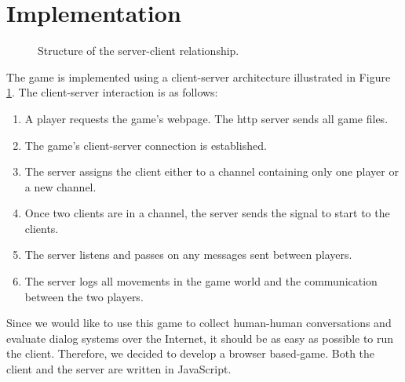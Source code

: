 \section{Implementation}



\begin{figure}
\caption{Structure of the server-client
  relationship.}
\label{fig:server-client}
\end{figure}

The game is implemented using a client-server architecture illustrated
in Figure \ref{fig:server-client}. The client-server interaction is as
follows:

\begin{enumerate}
\item A player requests the game's webpage. The http server sends all game files.
\item The game's client-server connection is established.
\item The server assigns the client either to a channel containing
  only one player or a new channel.
\item Once two clients are in a channel, the server sends the signal to start
  to the clients.
\item The server listens and passes on any messages sent between
  players.
\item The server logs all movements in the game world and the
  communication between the two players.
\end{enumerate}



Since we would like to use this game to collect human-human
conversations and evaluate dialog systems over the Internet, it should
be as easy as possible to run the client. Therefore, we decided to
develop a browser based-game. Both the client and the server are
written in JavaScript.

